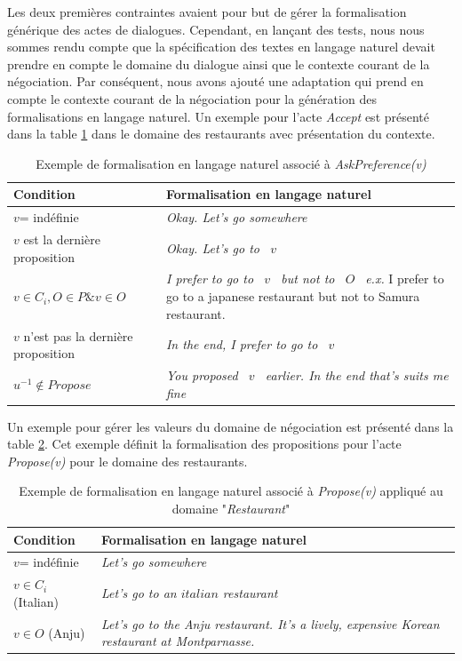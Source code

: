 Les deux premières contraintes avaient pour but de gérer la formalisation générique des actes de dialogues. Cependant, en lançant des tests, nous nous sommes rendu compte que la spécification des textes en langage naturel devait prendre en compte le domaine du dialogue ainsi que le contexte courant de la négociation. 
Par conséquent, nous avons ajouté une adaptation qui prend en compte le contexte courant de la négociation pour la génération des formalisations en langage naturel. Un exemple pour l'acte \emph{Accept} est présenté dans la table \ref{tab:AcceptEx} dans le domaine des restaurants avec présentation du contexte.


\begin{table} [h]
	\centering
	\begin{tabular} {p{4cm}| p{6.5cm}}
		\hline
		\hline
		\textbf{Condition} & \textbf{Formalisation en langage naturel} \\
		\hline
		$v$= indéfinie & \textit{Okay. Let's go somewhere} \\
		\hline
		$ v $ est la dernière proposition  & \textit{Okay. Let's go to \ $v$ \ } \\
		\hline
		$ v \in C_i,  O \in P  \& v \in O$ & \textit{I prefer to go to \ $v$ \, but not to \ $O$\ }
		\newline \emph{e.x.} I prefer to go to a japanese restaurant but not to Samura restaurant. \\
		\hline
		$ v $ n'est pas la dernière proposition & \textit{In the end, I prefer to go to  \ $v$ \ } \\
		\hline
		$u^{-1} \not \in Propose$ & \textit{You proposed  \ $v$ \ earlier. In the end that's suits me fine} \\
		\hline
		\hline
	\end{tabular}
	\caption{\label{tab:AcceptEx} Exemple de formalisation en langage naturel associé à \emph{AskPreference(v)}}
\end{table}

Un exemple pour gérer les valeurs du domaine de négociation est présenté dans la table \ref{tab:ProposeEx}. Cet exemple définit la formalisation des propositions pour l'acte \emph{Propose(v)} pour le domaine des restaurants.
\begin{table} [h]
	\centering
	\begin{tabular} {p{3.5cm} p{7cm}}
		\hline
		\hline
		\textbf{Condition} & \textbf{Formalisation en langage naturel} \\
		\hline
		$v$= indéfinie & \textit{Let's go somewhere } \\
		\hline
		$ v \in C_i$ (Italian)  & \textit{Let's go to an $italian$ restaurant} \\
		\hline
		$v \in O$ (Anju) & \textit{Let's go to the Anju restaurant. It's a lively, expensive Korean restaurant at Montparnasse.}\\
		\hline
		\hline
	\end{tabular}
	\caption{\label{tab:ProposeEx} Exemple de formalisation en langage naturel associé à \emph{Propose(v)} appliqué au domaine "\textit{Restaurant}"}
\end{table}


